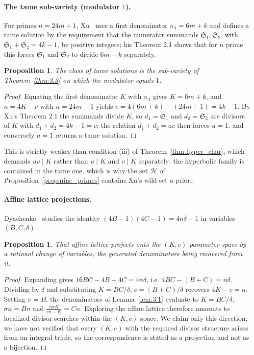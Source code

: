 \documentclass[11pt, a4paper]{article}
\theoremstyle{plain}
\newtheorem{proposition}[theorem]{Proposition}
\theoremstyle{definition}
\begin{document}
\paragraph{The tame sub-variety (modulator $1$).}
For primes $n=24m+1$, Xu~\cite{xu2026} uses a first denominator $n_1=6m+k$ and defines a tame solution by the requirement that the numerator summands $\mathfrak{S}_1,\mathfrak{S}_2$, with $\mathfrak{S}_1+\mathfrak{S}_2=4k-1$, be positive integers; his Theorem 2.1 shows that for $n$ prime this forces $\mathfrak{S}_1$ and $\mathfrak{S}_2$ to divide $6m+k$ separately.

\begin{proposition}\label{prop:tame}
The class of tame solutions is the sub-variety of Theorem~\ref{thm:3.3} on which the modulator equals $1$.
\end{proposition}
\begin{proof}
Equating the first denominator $K$ with $n_1$ gives $K=6m+k$, and $n=4K-c$ with $n=24m+1$ yields $c=4(6m+k)-(24m+1)=4k-1$. By Xu's Theorem 2.1 the summands divide $K$, so $d_1=\mathfrak{S}_1$ and $d_2=\mathfrak{S}_2$ are divisors of $K$ with $d_1+d_2=4k-1=c$; the relation $d_1+d_2=ac$ then forces $a=1$, and conversely $a=1$ returns a tame solution.
\end{proof}

This is strictly weaker than condition (iii) of Theorem~\ref{thm:hyper_char}, which demands $uv\mid K$ rather than $u\mid K$ and $v\mid K$ separately: the hyperbolic family is contained in the tame one, which is why the set $\mathcal{H}$ of Proposition~\ref{prop:nine_primes} contains Xu's wild set a priori.

\paragraph{Affine lattice projections.}
Dyachenko~\cite{dyachenko2025} studies the identity $(4B-1)(4C-1)=4n\delta+1$ in variables $(B,C,\delta)$.

\begin{proposition}\label{prop:affine}
That affine lattice projects onto the $(K,c)$ parameter space by a rational change of variables, the generated denominators being recovered from it.
\end{proposition}
\begin{proof}
Expanding gives $16BC-4B-4C=4n\delta$, i.e. $4BC-(B+C)=n\delta$. Dividing by $\delta$ and substituting $K=BC/\delta$, $c=(B+C)/\delta$ recovers $4K-c=n$. Setting $\sigma=B$, the denominators of Lemma~\ref{lem:3.1} evaluate to $K=BC/\delta$, $\sigma n=Bn$ and $\frac{n\sigma K}{c\sigma-K}=Cn$. Exploring the affine lattice therefore amounts to localized divisor searches within the $(K,c)$ space. We claim only this direction; we have not verified that every $(K,c)$ with the required divisor structure arises from an integral triple, so the correspondence is stated as a projection and not as a bijection.
\end{proof}
\end{document}

